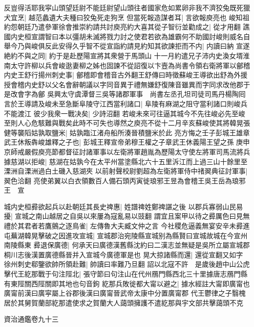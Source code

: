 反豈得活耶我寜山頭望廷尉不能廷尉望山頭往者國家危如累卵非我不濟狡兔既死獵犬宜烹|{
	越范蠡遺大夫種曰狡兔死走狗烹}
但當死報造謀者耳|{
	言欲報庾亮也}
峻知祖約怨朝廷乃遣參軍徐會推崇約請共討庾亮約大喜其從子智衍並勸成之|{
	從才用翻}
譙國内史桓宣謂智曰本以彊胡未滅將戮力討之使君若欲為雄霸何不助國討峻則威名自舉今乃與峻俱反此安得久乎智不從宣詣約請見約知其欲諫拒而不内|{
	内讀曰納}
宣遂絶約不與之同|{
	約于是赴歷陽宣將其衆營于馬頭山}
十一月約遣兄子沛内史渙女壻淮南太守許柳以兵會峻逖妻柳之姊也固諫不從詔復以卞壼為尚書令領右衛將軍以鄶稽内史王舒行揚州刺史事|{
	鄶稽即會稽音古外翻王舒傳曰時徵蘇峻王導欲出舒為外援授會稽内史舒以父名會辭朝議以字同音異于禮無嫌舒復陳音雖異而字同求改他郡于是改會字為鄶}
吳興太守虞潭督三吳等諸郡軍事　尚書左丞孔坦司徒司馬丹楊陶囘言於王導請及峻未至急斷阜陵守江西當利諸口|{
	阜陵有麻湖之阻守當利諸口則峻兵不能渡江}
彼少我衆一戰决矣|{
	少詩沼翻}
若峻未來可往逼其城今不先往峻必先至峻至則人心危駭難與戰矣此時不可失也導然之庾亮不從十二月辛亥蘇峻使其將韓晃張健等襲䧟姑孰取鹽米|{
	姑孰臨江渚舟船所湊晉積鹽米於此}
亮方悔之壬子彭城王雄章武王休叛犇峻雄釋之子也|{
	彭城王釋宣帝弟穆王權之子章武王休義陽王望之孫}
庚申京師戒嚴假庾亮節都督征討諸軍事以左衛將軍趙胤為歷陽太守使左將軍司馬流將兵據慈湖以拒峻|{
	慈湖在姑孰今在太平州當塗縣北六十五里泝江而上過三山十餘里至溧洲自溧洲過白土磯入慈湖夾}
以前射聲校尉劉超為左衛將軍侍中禇翜典征討軍事|{
	翜色洽翻}
亮使弟翼以白衣領數百人備石頭丙寅徙琅邪王昱為會稽王吳王岳為琅邪王　宣

城内史桓彛欲起兵以赴朝廷其長史禆惠|{
	姓譜禆姓鄭禆諶之後}
以郡兵寡弱山民易擾|{
	宣城之南山越居之自吳以來屢為寇亂易以豉翻}
謂宜且案甲以待之彛厲色曰見無禮於其君者若鷹鸇之逐鳥雀|{
	左傳魯大夫臧文仲之言}
今社稷危逼義無宴安辛未彛進屯蕪湖韓晃擊破之因進攻宣城|{
	宣城郡治宛陵縣宣城别為縣賢曰宣城故城在今宣州南陵縣東}
彛退保廣德|{
	何承天曰廣德漢舊縣沈約曰二漢志並無疑是吳所立屬宣城郡桐川志後漢置廣德縣晉并入宣城今廣德軍是也}
晃大掠諸縣而還|{
	還從宣翻又如字}
徐州刺史郗鑒欲帥所領赴難|{
	帥讀曰率難乃旦翻}
詔以北寇不許　是歲後趙中山公虎擊代王紇那戰于句注陘北|{
	張守節曰句注山在代州鴈門縣西北三十里據唐志鴈門縣有東陘關西陘關即其地也句音鉤}
紇那兵敗徙都大甯以避之|{
	據水經註大甯即廣甯也廣甯前漢曰廣寜屬上谷郡後漢曰廣甯晉武帝太康中分置廣甯郡}
代王鬱律之子翳槐居於其舅賀蘭部紇那遣使求之賀蘭大人藹頭擁護不遣紇那與宇文部共擊藹頭不克

資治通鑑卷九十三
